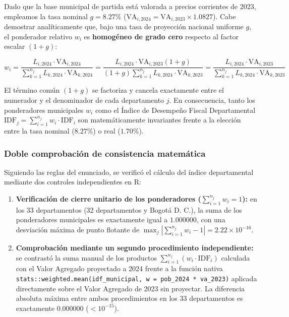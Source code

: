 \documentclass[
  10pt,
  letterpaper,
  DIV=11,
  numbers=noendperiod]{scrartcl}
\providecommand{\tightlist}{%
  \setlength{\itemsep}{0pt}\setlength{\parskip}{0pt}}
\begin{document}
Dado que la base municipal de partida está valorada a precios corrientes
de 2023, empleamos la tasa nominal \textbf{\(g = 8.27\%\)}
(\(\text{VA}_{i,2024} = \text{VA}_{i,2023} \times 1.0827\)). Cabe
demostrar analíticamente que, bajo una tasa de proyección nacional
uniforme \(g\), el ponderador relativo \(w_i\) es \textbf{homogéneo de
grado cero} respecto al factor escalar \((1 + g)\):

\[w_i = \frac{L_{i,2024} \cdot \text{VA}_{i,2024}}{\sum_{k=1}^{n_j} L_{k,2024} \cdot \text{VA}_{k,2024}} = \frac{L_{i,2024} \cdot \text{VA}_{i,2023}(1 + g)}{(1 + g)\sum_{k=1}^{n_j} L_{k,2024} \cdot \text{VA}_{k,2023}} = \frac{L_{i,2024} \cdot \text{VA}_{i,2023}}{\sum_{k=1}^{n_j} L_{k,2024} \cdot \text{VA}_{k,2023}}\]

El término común \((1 + g)\) se factoriza y cancela exactamente entre el
numerador y el denominador de cada departamento \(j\). En consecuencia,
tanto los ponderadores municipales \(w_i\) como el Índice de Desempeño
Fiscal Departamental
\(\text{IDF}_j = \sum_{i=1}^{n_j} w_i \cdot \text{IDF}_i\) son
matemáticamente invariantes frente a la elección entre la tasa nominal
(\(8.27\%\)) o real (\(1.70\%\)).

\subsubsection{Doble comprobación de consistencia
matemática}\label{doble-comprobaciuxf3n-de-consistencia-matemuxe1tica}

Siguiendo las reglas del enunciado, se verificó el cálculo del índice
departamental mediante dos controles independientes en R:

\begin{enumerate}
\def\labelenumi{\arabic{enumi}.}
\tightlist
\item
  \textbf{Verificación de cierre unitario de los ponderadores
  (\(\sum_{i=1}^{n_j} w_i = 1\)):} en los 33 departamentos (32
  departamentos y Bogotá D. C.), la suma de los ponderadores municipales
  es exactamente igual a \(1.000000\), con una desviación máxima de
  punto flotante de
  \(\max_j \left|\sum_{i=1}^{n_j} w_i - 1\right| = 2.22 \times 10^{-16}\).
\item
  \textbf{Comprobación mediante un segundo procedimiento independiente:}
  se contrastó la suma manual de los productos
  \(\sum_{i=1}^{n_j} (w_i \cdot \text{IDF}_i)\) calculada con el Valor
  Agregado proyectado a 2024 frente a la función nativa
  \texttt{stats::weighted.mean(idf\_municipal,\ w\ =\ pob\_2024\ *\ va\_2023)}
  aplicada directamente sobre el Valor Agregado de 2023 sin proyectar.
  La diferencia absoluta máxima entre ambos procedimientos en los 33
  departamentos es exactamente \textbf{\(0.000000\)} (\(< 10^{-15}\)).
\end{enumerate}
\end{document}
